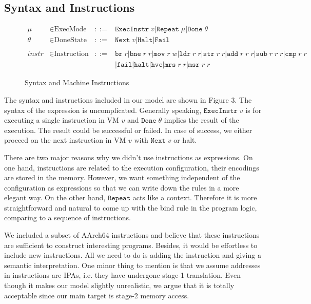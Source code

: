 \documentclass[a4paper]{article}
\newcommand*{\derived}{::=}
\newcommand*{\MODE}{\text{ExecMode}}
\newcommand*{\DONE}{\text{DoneState}}
\newcommand*{\INSTR}{\text{Instruction}}
\newcommand*{\instrm}[1]{\mathtt{#1}}
\newcommand*{\EI}[1]{\mathtt{ExecInstr} \; {#1}}
\newcommand*{\DN}[1]{\mathtt{Done} \; {#1}}
\newcommand*{\NXT}[1]{\mathtt{Next} \; {#1}}
\begin{document}
\subsection{Syntax and Instructions}
\begin{figure}[h!]
  \begin{align*}
    \mu &\in \MODE &\derived & \mathtt{ExecInstr} \; v | \mathtt{Repeat} \; \mu | \mathtt{Done} \; \theta \\
    \theta &\in \DONE &\derived & \NXT{v} | \mathtt{Halt} | \mathtt{Fail}\\
    \\
    instr & \in  \INSTR &\derived & \instrm{br} \; r |\instrm{bne} \; r \; r |
                                    \instrm{mov} \; r \; w | \instrm{ldr} \; r\; r|
                                    \instrm{str} \; r \; r | \instrm{add} \; r \; r \; r |
                                    \instrm{sub} \; r \; r \; r | \instrm{cmp} \; r \; r \\
        & & & | \instrm{fail} | \instrm{halt} | \instrm{hvc} |\instrm{mrs} \; r\;r | \instrm{msr} \; r \; r
  \end{align*}
  \caption{Syntax and Machine Instructions}
\end{figure}
The syntax and instructions included in our model are shown in Figure 3. The
syntax of the expression is uncomplicated. Generally speaking, $\EI{v}$ is for
executing a single instruction in VM $v$ and $\DN{\theta}$ implies the result of
the execution. The result could be successful or failed. In case of success, we
either proceed on the next instruction in VM $v$ with $\NXT{v}$ or halt.

There are two major reasons why we didn't use instructions as expressions. On
one hand,
instructions are related to the execution configuration, their encodings are
stored in the memory. However, we want something independent of the
configuration as expressions so that we can write down the rules in a more
elegant way. On the other hand, $\mathtt{Repeat}$ acts like a context.
Therefore it is more straightforward and natural to come up with the bind rule
in the program logic, comparing to a sequence of instructions.


We included a subset of AArch64 instructions and believe that these instructions
are sufficient to construct interesting programs. Besides, it would be
effortless to include new instructions. All we need to do is adding the
instruction and giving a semantic interpretation. One minor thing to mention is
that we assume addresses in instructions are IPAs, i.e. they have undergone
stage-1 translation. Even though it makes our model slightly unrealistic, we argue
that it is totally acceptable since our main target is stage-2 memory access.
\end{document}
